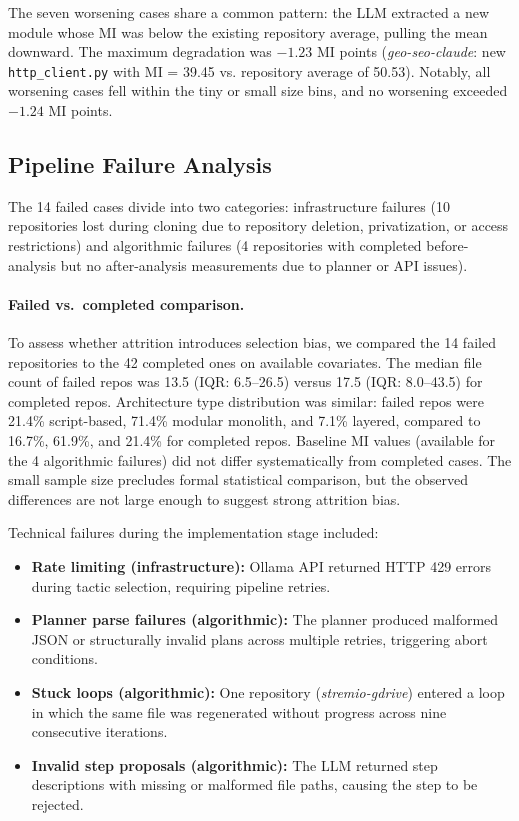 \documentclass[sigconf,review,anonymous]{acmart}
\begin{document}
The seven worsening cases share a common pattern: the LLM extracted a new module whose MI was below the existing repository average, pulling the mean downward. The maximum degradation was $-1.23$ MI points (\textit{geo-seo-claude}: new \texttt{http\_client.py} with MI = 39.45 vs. repository average of 50.53). Notably, all worsening cases fell within the tiny or small size bins, and no worsening exceeded $-1.24$ MI points.

\subsection{Pipeline Failure Analysis}

The 14 failed cases divide into two categories: infrastructure failures (10 repositories lost during cloning due to repository deletion, privatization, or access restrictions) and algorithmic failures (4 repositories with completed before-analysis but no after-analysis measurements due to planner or API issues).

\paragraph{Failed vs.\ completed comparison.}
To assess whether attrition introduces selection bias, we compared the 14 failed repositories to the 42 completed ones on available covariates. The median file count of failed repos was 13.5 (IQR: 6.5--26.5) versus 17.5 (IQR: 8.0--43.5) for completed repos. Architecture type distribution was similar: failed repos were 21.4\% script-based, 71.4\% modular monolith, and 7.1\% layered, compared to 16.7\%, 61.9\%, and 21.4\% for completed repos. Baseline MI values (available for the 4 algorithmic failures) did not differ systematically from completed cases. The small sample size precludes formal statistical comparison, but the observed differences are not large enough to suggest strong attrition bias.

Technical failures during the implementation stage included:

\begin{itemize}[nosep]
    \item \textbf{Rate limiting (infrastructure):} Ollama API returned HTTP 429 errors during tactic selection, requiring pipeline retries.
    \item \textbf{Planner parse failures (algorithmic):} The planner produced malformed JSON or structurally invalid plans across multiple retries, triggering abort conditions.
    \item \textbf{Stuck loops (algorithmic):} One repository (\textit{stremio-gdrive}) entered a loop in which the same file was regenerated without progress across nine consecutive iterations.
    \item \textbf{Invalid step proposals (algorithmic):} The LLM returned step descriptions with missing or malformed file paths, causing the step to be rejected.
\end{itemize}
\end{document}
